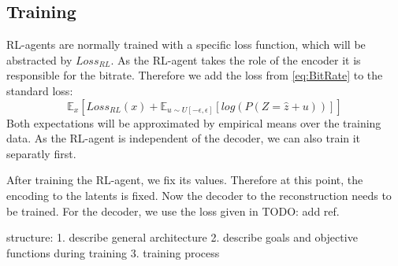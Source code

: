 



\subsection{Training}
    RL-agents are normally trained with a specific loss function, which will be
    abstracted by $Loss_{RL}$. As the RL-agent takes the role of the encoder it
    is responsible for the bitrate. Therefore we add the loss from
    \ref{eq:BitRate} to the standard loss:
    \begin{equation}
        \mathbb{E}_{x}[Loss_{RL}(x) + \mathbb{E}_{u \sim U[-\epsilon, \epsilon]}[log(P(Z=\hat{z} + u))]]
    \end{equation}
    Both expectations will be approximated by empirical means over the training
    data. As the RL-agent is independent of the decoder, we can also train it
    separatly first.

    After training the RL-agent, we fix its values. Therefore at this point, the
    encoding to the latents is fixed. Now the decoder to the reconstruction
    needs to be trained. For the decoder, we use the loss given in TODO: add ref. 











structure:
1. describe general architecture
2. describe goals and objective functions during training
3. training process